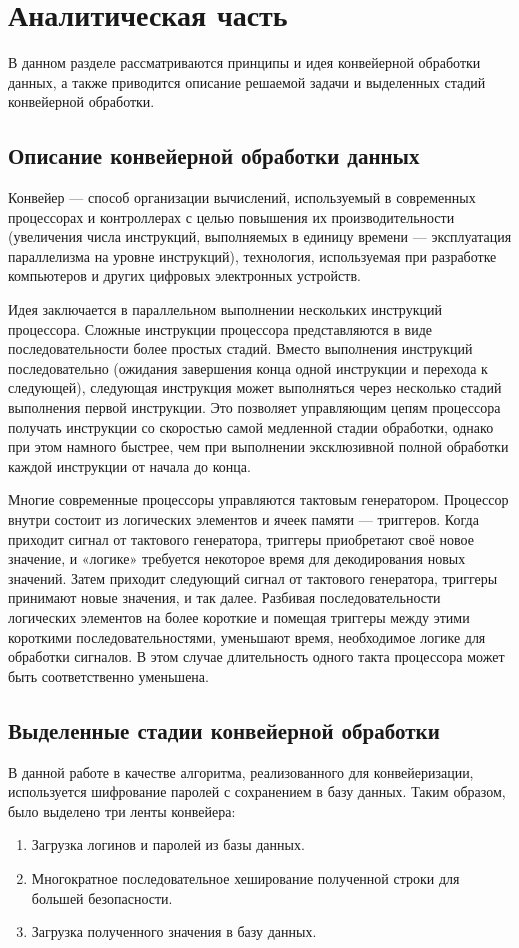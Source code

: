 \documentclass[a4paper,oneside,14pt]{extreport}
\begin{document}
\chapter{Аналитическая часть}	
В данном разделе рассматриваются принципы и идея конвейерной обработки данных, а также приводится описание решаемой задачи и выделенных стадий конвейерной обработки.
	
\section{Описание конвейерной обработки данных}
Конвейер\cite{conveyor} — способ организации вычислений, используемый в современных процессорах и контроллерах с целью повышения их производительности (увеличения числа инструкций, выполняемых в единицу времени — эксплуатация параллелизма на уровне инструкций), технология, используемая при разработке компьютеров и других цифровых электронных устройств.

Идея заключается в параллельном выполнении нескольких инструкций процессора. Сложные инструкции процессора представляются в виде последовательности более простых стадий. Вместо выполнения инструкций последовательно (ожидания завершения конца одной инструкции и перехода к следующей), следующая инструкция может выполняться через несколько стадий выполнения первой инструкции. Это позволяет управляющим цепям процессора получать инструкции со скоростью самой медленной стадии обработки, однако при этом намного быстрее, чем при выполнении эксклюзивной полной обработки каждой инструкции от начала до конца.

Многие современные процессоры управляются тактовым генератором. Процессор внутри состоит из логических элементов и ячеек памяти — триггеров. Когда приходит сигнал от тактового генератора, триггеры приобретают своё новое значение, и «логике» требуется некоторое время для декодирования новых значений. Затем приходит следующий сигнал от тактового генератора, триггеры принимают новые значения, и так далее. Разбивая последовательности логических элементов на более короткие и помещая триггеры между этими короткими последовательностями, уменьшают время, необходимое логике для обработки сигналов. В этом случае длительность одного такта процессора может быть соответственно уменьшена.

\section{Выделенные стадии конвейерной обработки}
В данной работе в качестве алгоритма, реализованного для конвейеризации, используется шифрование паролей с сохранением в базу данных. Таким образом, было выделено три ленты конвейера:
\begin{enumerate}
	\item Загрузка логинов и паролей из базы данных.
	\item Многократное последовательное хеширование полученной строки для большей безопасности.
	\item Загрузка полученного значения в базу данных.
\end{enumerate}
\end{document}
